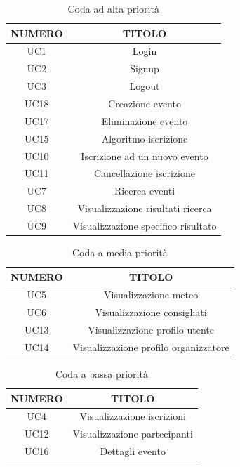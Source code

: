 \begin{table}
\begin{center}
\begin{tabular}{ |c|c|}
 \hline
 \textbf{NUMERO}& \textbf{TITOLO} \\ \hline
 UC1& Login\\ \hline
 UC2& Signup\\ \hline
 UC3& Logout\\ \hline
 UC18& Creazione evento\\ \hline
 UC17& Eliminazione evento\\ \hline
 UC15& Algoritmo iscrizione\\ \hline
 UC10 & Iscrizione ad un nuovo evento\\ \hline
 UC11 & Cancellazione iscrizione\\ \hline
 UC7 & Ricerca eventi \\ \hline
 UC8 & Visualizzazione risultati ricerca \\ \hline
 UC9 & Visualizzazione specifico risultato \\ \hline
\end{tabular}
  \caption{Coda ad alta priorità}
  \label{tab: alta-priorità}
\end{center}
\end{table}

\begin{table}
\begin{center}
\begin{tabular}{ |c|c|}
 \hline
 \textbf{NUMERO}& \textbf{TITOLO} \\ \hline
 UC5& Visualizzazione meteo\\ \hline
 UC6& Visualizzazione consigliati\\ \hline
 UC13&Visualizzazione profilo utente\\ \hline
 UC14&Visualizzazione profilo organizzatore\\ \hline
\end{tabular}
  \caption{Coda a media priorità}
  \label{tab: media-priorità}
\end{center}
\end{table}

\begin{table}
\begin{center}
\begin{tabular}{ |c|c|}
 \hline
 \textbf{NUMERO}& \textbf{TITOLO} \\ \hline
 UC4& Visualizzazione iscrizioni\\ \hline
 UC12& Visualizzazione partecipanti\\ \hline
 UC16& Dettagli evento\\ \hline
\end{tabular}
  \caption{Coda a bassa priorità}
  \label{tab: bassa-priorità}
\end{center}
\end{table}

